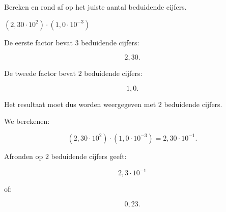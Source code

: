 \documentclass{ximera}
\begin{document}
\begin{oefening}{\oefB\ESS}

Bereken en rond af op het juiste aantal beduidende cijfers.

\begin{question}
\(
(2{,}30\cdot10^2)
\cdot
(1{,}0\cdot10^{-3})
\)

\begin{oplossing}
De eerste factor bevat $3$ beduidende cijfers:

\[
2{,}30.
\]

De tweede factor bevat $2$ beduidende cijfers:

\[
1{,}0.
\]

Het resultaat moet dus worden weergegeven met $2$ beduidende cijfers.

We berekenen:

\[
(2{,}30\cdot10^2)
\cdot
(1{,}0\cdot10^{-3})
=
2{,}30\cdot10^{-1}.
\]

Afronden op $2$ beduidende cijfers geeft:

\[
\boxed{2{,}3\cdot10^{-1}}
\]

of:

\[
\boxed{0{,}23}.
\]
\end{oplossing}
\end{question}

\end{oefening}
\end{document}

